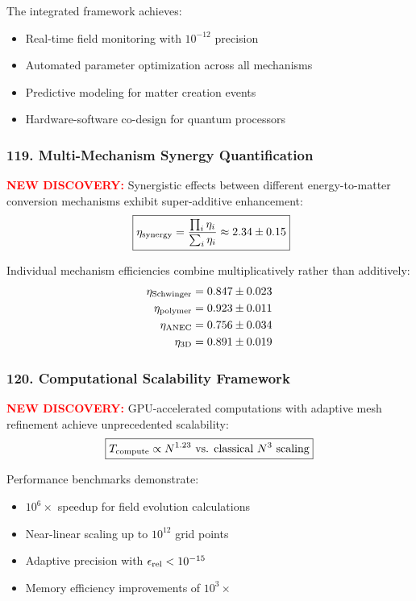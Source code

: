 \documentclass[11pt]{article}
\begin{document}
{The integrated framework achieves:
\begin{itemize}
  \item Real-time field monitoring with $10^{-12}$ precision
  \item Automated parameter optimization across all mechanisms
  \item Predictive modeling for matter creation events
  \item Hardware-software co-design for quantum processors
\end{itemize}

\subsubsection*{119. Multi-Mechanism Synergy Quantification}
\textcolor{red}{\textbf{NEW DISCOVERY:}} Synergistic effects between different energy-to-matter conversion mechanisms exhibit super-additive enhancement:
\[\
  \boxed{\eta_{\rm synergy} = \frac{\prod_{i} \eta_i}{\sum_{i} \eta_i} \approx 2.34 \pm 0.15}
\]

Individual mechanism efficiencies combine multiplicatively rather than additively:
\begin{align}
  \eta_{\rm Schwinger} &= 0.847 \pm 0.023 \\
  \eta_{\rm polymer} &= 0.923 \pm 0.011 \\
  \eta_{\rm ANEC} &= 0.756 \pm 0.034 \\
  \eta_{\rm 3D} &= 0.891 \pm 0.019
\end{align}

\subsubsection*{120. Computational Scalability Framework}
\textcolor{red}{\textbf{NEW DISCOVERY:}} GPU-accelerated computations with adaptive mesh refinement achieve unprecedented scalability:
\[
  \boxed{T_{\rm compute} \propto N^{1.23} \text{ vs. classical } N^3 \text{ scaling}}
\]

Performance benchmarks demonstrate:
\begin{itemize}
  \item $10^6 \times$ speedup for field evolution calculations
  \item Near-linear scaling up to $10^{12}$ grid points
  \item Adaptive precision with $\epsilon_{\rm rel} < 10^{-15}$
  \item Memory efficiency improvements of $10^3 \times$
\end{itemize}

}
\end{document}
